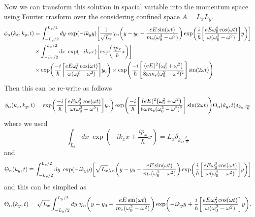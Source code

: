 \noindent
Now we can transform this solution in spacial variable into the momentum space using Fourier trasform over the considering confined space $A=L_xL_y$.
\begin{equation} \label{3.21}
  \begin{aligned}
    \phi_{\alpha}(k_x,k_y,t)  &=
    \int_{-L_y/2}^{L_y/2} dy\; \exp(-ik_y y)
    \qty[
    \frac{1}{\sqrt{L_x}}
    \chi_{n}\qty(y - y_0 - \frac{eE\sin(\omega t)}{m_e(\omega_0^2 - \omega^2)} )
    \exp(
     \frac{i}{\hbar}
     \qty[
     \frac{eE\omega_0^2\cos(\omega t)}{\omega(\omega_0^2 - \omega^2)}]
     y)] \\
     & \times
     \int_{-L_x/2}^{L_x/2} dx\; \exp(-ik_x x)
     \qty[
     \exp( \frac{i p_x }{\hbar}x )
     ] \\
     &
     \times
     \exp(
      \frac{-i}{\hbar}
      \qty[
      \frac{eE\omega_0^2\cos(\omega t)}{\omega(\omega_0^2 - \omega^2)}]y_0)
      \times
     \exp(\frac{-i}{\hbar}
     \qty[
     \frac{(eE)^2\qty(\omega_0^2 + \omega^2)}{8\omega m_e(\omega_0^2 - \omega^2)^2}
     ]\sin(2\omega t)
     )
  \end{aligned}
\end{equation}
Then this can be re-write as follows
\begin{equation} \label{3.22}
    \phi_{\alpha}(k_x,k_y,t)  =
    \exp(
     \frac{-i}{\hbar}
     \qty[
     \frac{eE\omega_0^2\cos(\omega t)}{\omega(\omega_0^2 - \omega^2)}]y_0)
    \exp(\frac{-i}{\hbar}
    \qty[
    \frac{(eE)^2\qty(\omega_0^2 + \omega^2)}{8\omega m_e(\omega_0^2 - \omega^2)^2}
    ]\sin(2\omega t))
    \Theta_{\alpha}(k_y,t)
    \delta_{k_x,\frac{p_x}{\hbar}}
\end{equation}
where we used
\begin{equation} \label{3.23}
  \int_{L_x} dx\;
  \exp( -ik_x x + \frac{i p_x }{\hbar}x ) =
  L_x \delta_{k_x,\frac{p_x}{\hbar}}
\end{equation}
and
\begin{equation} \label{3.24}
  \Theta_{\alpha}(k_y,t) \equiv
  \int_{-L_y/2}^{L_y/2}  dy\; \exp(-ik_y y)
  \qty[
  \sqrt{L_x}
  \chi_{n}\qty(y -y_0 - \frac{eE\sin(\omega t)}{m_e(\omega_0^2 - \omega^2)} )
  \exp(
   \frac{i}{\hbar}
   \qty[
   \frac{eE\omega_0^2\cos(\omega t)}{\omega(\omega_0^2 - \omega^2)}]
   y)]
\end{equation}
and this can be simplied as
\begin{equation} \label{3.25}
  \Theta_{\alpha}(k_y,t) =
  \sqrt{L_x}
  \int_{-L_y/2}^{L_y/2} dy\;
  \chi_{n}\qty(y -y_0 - \frac{eE\sin(\omega t)}{m_e(\omega_0^2 - \omega^2)} )
  \exp(
    -ik_y y +
   \frac{i}{\hbar}
   \qty[
   \frac{eE\omega_0^2\cos(\omega t)}{\omega(\omega_0^2 - \omega^2)}] y).
\end{equation}
